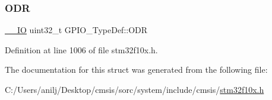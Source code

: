 \mbox{\label{struct_g_p_i_o___type_def_a6fb78f4a978a36032cdeac93ac3c9c8b}} 
\subsubsection{\texorpdfstring{O\+DR}{ODR}}
{\footnotesize\ttfamily \hyperlink{core__sc300_8h_aec43007d9998a0a0e01faede4133d6be}{\+\_\+\+\_\+\+IO} uint32\+\_\+t G\+P\+I\+O\+\_\+\+Type\+Def\+::\+O\+DR}



Definition at line 1006 of file stm32f10x.\+h.



The documentation for this struct was generated from the following file\+:\begin{DoxyCompactItemize}
\item 
C\+:/\+Users/anilj/\+Desktop/cmsis/sorc/system/include/cmsis/\hyperlink{stm32f10x_8h}{stm32f10x.\+h}\end{DoxyCompactItemize}
